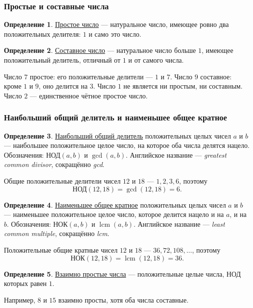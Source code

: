 \documentclass[12pt,a4paper]{article}
\theoremstyle{definition}
\newtheorem{definition}{Определение}[section]
\theoremstyle{plain}
\theoremstyle{remark}
\newcommand{\term}[1]{\uline{#1}}
\begin{document}
\subsubsection*{Простые и составные числа}

\begin{definition}
\term{Простое число} --- натуральное число, имеющее ровно два положительных делителя:
\(1\) и само это число.
\end{definition}

\begin{definition}
\term{Составное число} --- натуральное число больше \(1\), имеющее положительный делитель,
отличный от \(1\) и от самого числа.
\end{definition}

Число \(7\) простое: его положительные делители --- \(1\) и \(7\).
Число \(9\) составное: кроме \(1\) и \(9\), оно делится на \(3\).
Число \(1\) не является ни простым, ни составным.
Число \(2\) --- единственное чётное простое число.

\subsubsection*{Наибольший общий делитель и наименьшее общее кратное}

\begin{definition}
\term{Наибольший общий делитель} положительных целых чисел \(a\) и \(b\) ---
наибольшее положительное целое число, на которое оба числа делятся нацело.
Обозначения: \(\text{НОД}(a,b)\) и \(\gcd(a,b)\).
Английское название --- \emph{greatest common divisor}, сокращённо \emph{gcd}.
\end{definition}

Общие положительные делители чисел \(12\) и \(18\) --- \(1,2,3,6\), поэтому
\[
\text{НОД}(12,18)=\gcd(12,18)=6.
\]

\begin{definition}
\term{Наименьшее общее кратное} положительных целых чисел \(a\) и \(b\) ---
наименьшее положительное целое число, которое делится нацело и на \(a\), и на \(b\).
Обозначения: \(\text{НОК}(a,b)\) и \(\operatorname{lcm}(a,b)\).
Английское название --- \emph{least common multiple}, сокращённо \emph{lcm}.
\end{definition}

Положительные общие кратные чисел \(12\) и \(18\) --- \(36,72,108,\ldots\), поэтому
\[
\text{НОК}(12,18)=\operatorname{lcm}(12,18)=36.
\]

\begin{definition}
\term{Взаимно простые числа} --- положительные целые числа, НОД которых равен \(1\).
\end{definition}
Например, \(8\) и \(15\) взаимно просты, хотя оба числа составные.
\end{document}
